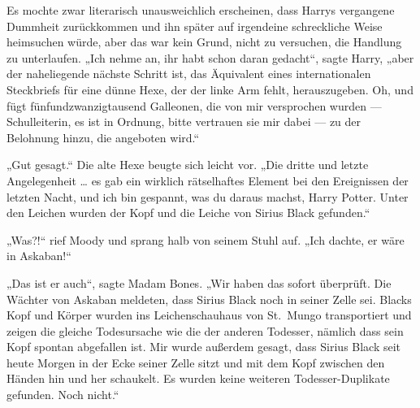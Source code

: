 Es mochte zwar literarisch unausweichlich erscheinen, dass Harrys vergangene Dummheit zurückkommen und ihn später auf irgendeine schreckliche Weise heimsuchen würde, aber das war kein Grund, nicht zu versuchen, die Handlung zu unterlaufen.
„Ich nehme an, ihr habt schon daran gedacht“, sagte Harry, „aber der naheliegende nächste Schritt ist, das Äquivalent eines internationalen Steckbriefs für eine dünne Hexe, der der linke Arm fehlt, herauszugeben. Oh, und fügt fünfundzwanzigtausend Galleonen, die von mir versprochen wurden — Schulleiterin, es ist in Ordnung, bitte vertrauen sie mir dabei — zu der Belohnung hinzu, die angeboten wird.“

„Gut gesagt.“
Die alte Hexe beugte sich leicht vor.
„Die dritte und letzte Angelegenheit … es gab ein wirklich rätselhaftes Element bei den Ereignissen der letzten Nacht, und ich bin gespannt, was du daraus machst, Harry Potter. Unter den Leichen wurden der Kopf und die Leiche von Sirius Black gefunden.“

„Was?!“ rief Moody und sprang halb von seinem Stuhl auf.
„Ich dachte, er wäre in Askaban!“

„Das ist er auch“, sagte Madam Bones.
„Wir haben das sofort überprüft. Die Wächter von Askaban meldeten, dass Sirius Black noch in seiner Zelle sei. Blacks Kopf und Körper wurden ins Leichenschauhaus von St.~Mungo transportiert und zeigen die gleiche Todesursache wie die der anderen Todesser, nämlich dass sein Kopf spontan abgefallen ist. Mir wurde außerdem gesagt, dass Sirius Black seit heute Morgen in der Ecke seiner Zelle sitzt und mit dem Kopf zwischen den Händen hin und her schaukelt. Es wurden keine weiteren Todesser-Duplikate gefunden. Noch nicht.“

